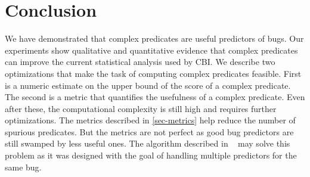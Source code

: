 
\section{Conclusion}
\label{sec-conc}
We have demonstrated that complex predicates are useful predictors of bugs.  Our experiments show qualitative and quantitative evidence that complex predicates can improve the current statistical analysis used by CBI.  We describe two optimizations that make the task of computing complex predicates feasible.  First is a numeric estimate on the upper bound of the score of a complex predicate.  The second is a metric that quantifies the usefulness of a complex predicate.  Even after these, the computational complexity is still high and requires further optimizations.  The metrics described in \autoref{sec-metrics} help reduce the number of spurious predicates.  But the metrics are not perfect as good bug predictors are still swamped by less useful ones.  The algorithm described in ~\cite{Zheng:2006:SDSIMB} may solve this problem as it was designed with the goal of handling multiple predictors for the same bug.

